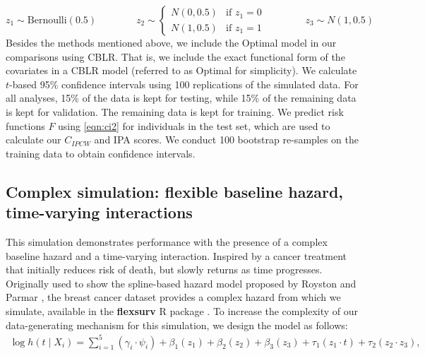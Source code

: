 \documentclass[APA,LATO1COL]{WileyNJD-v2}
\begin{document}
\[
z_{1} \sim \textrm{Bernoulli}(0.5) \qquad \qquad %
z_{2} \sim \begin{cases}
 N(0,0.5) & \textrm{if } z_{1}=0\\ 
 N(1,0.5) & \textrm{if } z_{1}=1
\end{cases} \qquad \qquad
z_{3} \sim N(1,0.5)
\]
Besides the methods mentioned above, we include the Optimal model in our
comparisons using CBLR. That is, we include the exact functional form of
the covariates in a CBLR model (referred to as Optimal for simplicity).
We calculate \(t\)-based 95\% confidence intervals using 100
replications of the simulated data. For all analyses, 15\% of the data is 
kept for testing, while 15\% of the remaining data is kept for validation. 
The remaining data is kept for training. We predict risk functions \(F\) using
\eqref{eqn:ci2} for individuals in the test set, which are used to
calculate our \(C_{IPCW}\) and IPA scores. We conduct 100 bootstrap
re-samples on the training data to obtain confidence intervals.

\hypertarget{complex-simulation-flexible-baseline-hazard-time-varying-interactions}{%
\subsection{Complex simulation: flexible baseline hazard, time-varying
interactions}\label{complex-simulation-flexible-baseline-hazard-time-varying-interactions}}

This simulation demonstrates performance with the presence of a complex
baseline hazard and a time-varying interaction. Inspired by a cancer treatment 
that initially reduces risk of death, but slowly returns as time progresses. 
Originally used to show the spline-based hazard model proposed by Royston and Parmar
\citep{royston2002flexible}, the breast cancer dataset provides a
complex hazard from which we simulate, available in the
\textbf{flexsurv} R package \citep{flexsurv}. To increase the complexity
of our data-generating mechanism for this simulation, we design the
model as follows: \begin{align}
\log h(t \mid X_i) =\sum_{i=1}^{5} (\gamma_{i} \cdot \psi_{i}) + \beta_{{1}} (z_{1}) + \beta_{{2}} (z_{2})+ \beta_{{3}} (z_{3})+ \tau_{1} ( z_{1} \cdot t)+ \tau_{2} (z_{2} \cdot z_{3}), \nonumber
\end{align}
\end{document}
